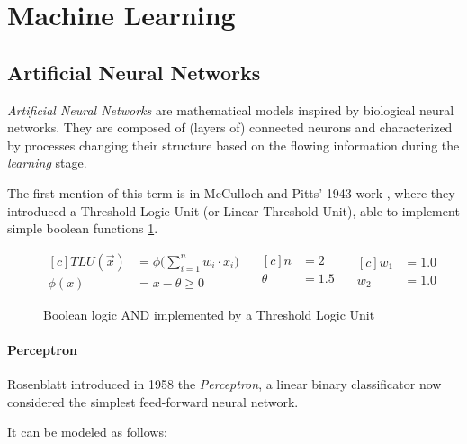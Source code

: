 \section{Machine Learning}

\subsection{Artificial Neural Networks}

\textit{Artificial Neural Networks} are mathematical models inspired by biological neural networks. They are composed of (layers of) connected neurons and characterized by processes changing their structure based on the flowing information during the \textit{learning} stage.

The first mention of this term is in McCulloch and Pitts' 1943 work \cite{McCulloch1943}, where they introduced a Threshold Logic Unit (or Linear Threshold Unit), able to implement simple boolean functions \ref{fig:TLU}.

\begin{figure}[H]
	\centering
	\begin{equation*}
		\begin{aligned}[c]
			TLU(\vec{x}) & = \phi \bigg( \sum_{i=1}^{n}{w_{i} \cdot x_{i}} \bigg) \\
			\phi(x)      & = x - \theta \geq 0
		\end{aligned}
		\quad
		\begin{aligned}[c]
			n      & = 2   \\
			\theta & = 1.5 \\
		\end{aligned}
		\quad
		\begin{aligned}[c]
			w_{1} & = 1.0 \\
			w_{2} & = 1.0
		\end{aligned}
	\end{equation*}
	\caption{Boolean logic AND implemented by a Threshold Logic Unit}
	\label{fig:TLU}
\end{figure}

\paragraph{Perceptron}

Rosenblatt introduced in 1958 the \textit{Perceptron}\cite{rosenblatt1958perceptron}, a linear binary classificator now considered the simplest feed-forward neural network.

It can be modeled as follows:

